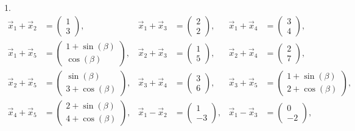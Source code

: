 \documentclass[11pt]{exam}
\begin{document}
\begin{questions}
\begin{solution}\\ \\
	1. 
	\begin{align*}
		\vec{x}_1+\vec{x}_2&=\left(\begin{array}{c}1\\3\end{array}\right),&
		\vec{x}_1+\vec{x}_3&=\left(\begin{array}{c}2\\2\end{array}\right),&
		\vec{x}_1+\vec{x}_4&=\left(\begin{array}{c}3\\4\end{array}\right),\\
		\vec{x}_1+\vec{x}_5&=\left(\begin{array}{c}1+\sin(\beta)\\\cos(\beta)\end{array}\right),&
		\vec{x}_2+\vec{x}_3&=\left(\begin{array}{c}1\\5\end{array}\right),&
		\vec{x}_2+\vec{x}_4&=\left(\begin{array}{c}2\\7\end{array}\right),\\
		\vec{x}_2+\vec{x}_5&=\left(\begin{array}{c}\sin(\beta)\\3+\cos(\beta)\end{array}\right),&
		\vec{x}_3+\vec{x}_4&=\left(\begin{array}{c}3\\6\end{array}\right),&
		\vec{x}_3+\vec{x}_5&=\left(\begin{array}{c}1+\sin(\beta)\\2+\cos(\beta)\end{array}\right),\\
		\vec{x}_4+\vec{x}_5&=\left(\begin{array}{c}2+\sin(\beta)\\4+\cos(\beta)\end{array}\right),&
		\vec{x}_1-\vec{x}_2&=\left(\begin{array}{c}1\\-3\end{array}\right),&
		\vec{x}_1-\vec{x}_3&=\left(\begin{array}{c}0\\-2\end{array}\right),\\

\end{align*}
\end{solution}
\end{questions}
\end{document}
